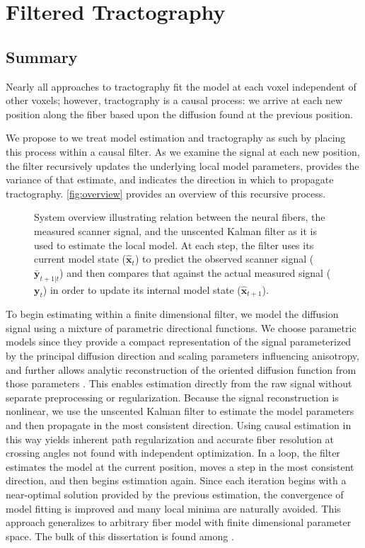 \documentclass[final,hyperref]{gatech-thesis}
\renewcommand{\v}[1]{\ensuremath{\mathbf #1}\xspace}
\newcommand{\x}{\v x}
\newcommand{\y}{\v y}
\begin{document}
\chapter{Filtered Tractography}

\section{Summary}

Nearly all approaches to tractography fit the model at each voxel independent
of other voxels; however, tractography is a causal process: we arrive at each
new position along the fiber based upon the diffusion found at the previous
position.

We propose to we treat model estimation and tractography as such by placing
this process within a causal filter.
%
As we examine the signal at each new position, the filter recursively updates
the underlying local model parameters, provides the variance of that estimate,
and indicates the direction in which to propagate tractography.
\autoref{fig:overview} provides an overview of this recursive process.
\begin{figure}[t]
  \centering
  \resizebox{!}{1.8in}{}
  \caption{System overview illustrating relation between the neural fibers,
    the measured scanner signal, and the unscented Kalman filter as it is used
    to estimate the local model.  At each step, the filter uses its current
    model state ($\hat{\x}_t$) to predict the observed scanner signal
    ($\bar{\y}_{t+1|t}$) and then compares that against the actual measured
    signal ($\y_t$) in order to update its internal model state
    ($\hat{\x}_{t+1}$).}
  \label{fig:overview}
\end{figure}

To begin estimating within a finite dimensional filter, we model the diffusion
signal using a mixture of parametric directional functions.  We choose
parametric models since they provide a compact representation of the signal
parameterized by the principal diffusion direction and scaling parameters
influencing anisotropy, and further allows analytic reconstruction of the
oriented diffusion function from those parameters
\cite{malcolm2010tmi,Rathi2009mia_w}.  This enables estimation directly from
the raw signal without separate preprocessing or regularization.
%
Because the signal reconstruction is nonlinear, we use the unscented Kalman
filter to estimate the model parameters and then propagate in the most
consistent direction.
%
Using causal estimation in this way yields inherent path regularization and
accurate fiber resolution at crossing angles not found with independent
optimization.  In a loop, the filter estimates the model at the current
position, moves a step in the most consistent direction, and then begins
estimation again.
%
Since each iteration begins with a near-optimal solution provided by the
previous estimation, the convergence of model fitting is improved and many
local minima are naturally avoided.
%
This approach generalizes to arbitrary fiber model with finite dimensional
parameter space.  The bulk of this dissertation is found among
\cite{malcolm2010tmi,malcolm2009ipmi,malcolm2009cukf}.
\end{document}
